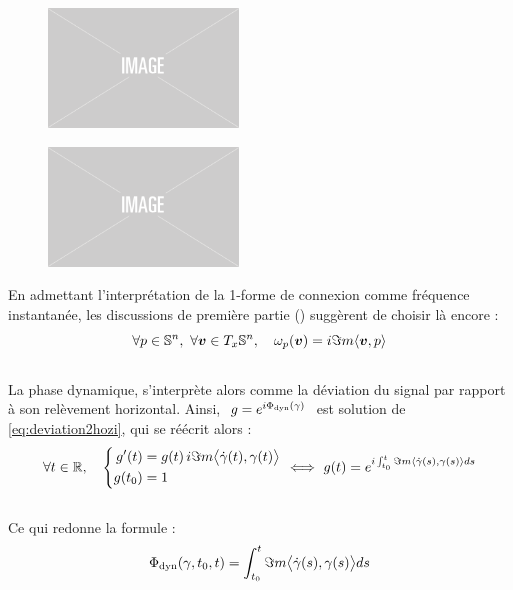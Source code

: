 \begin{figure}[h]
	\begin{floatrow}		
			{\includegraphics[width=0.45\textwidth]{fig/placeholder}}
			
		{\includegraphics[width=0.45\textwidth]{fig/placeholder}}
	\end{floatrow}
\end{figure}

En admettant l'interprétation de la 1-forme de connexion comme fréquence instantanée, les discussions de première partie () suggèrent de choisir là encore :
\begin{equation} \label{eq:conn2SUPC}
	\forall p\in\S{n},\ \forall \bf{v}\in\tg[x]{\S{n}},\quad \conn_p(\bf{v}) = i\Im m \langle \bf{v}, p\rangle
\end{equation}
\\
La phase dynamique, s'interprète alors comme la déviation du signal par rapport à son relèvement horizontal. Ainsi, $\ g = e^{i\phased(\gamma)}\ $ est solution de \eqref{eq:deviation2hozi}, qui se réécrit alors :
\[\forall t\in\R,\quad \left\{ \begin{aligned}
	g'(t)  &= g(t)\, i\Im m \big\langle \dot{\gamma}(t) , \gamma(t) \big\rangle \\
	g(t_0) &= 1
\end{aligned}\ \right. \Llr\ g(t) = e^{i \int_{t_0}^t \Im m\langle \dot{\gamma}(s) , \gamma(s) \rangle ds}\]
\\
Ce qui redonne la formule :
\begin{equation}\label{eq:phased_vgeodiff}
	\phased(\gamma, t_0, t) = \int_{t_0}^t \Im m\big\langle \dot{\gamma}(s) , \gamma(s) \big\rangle ds
\end{equation}
\skipl

